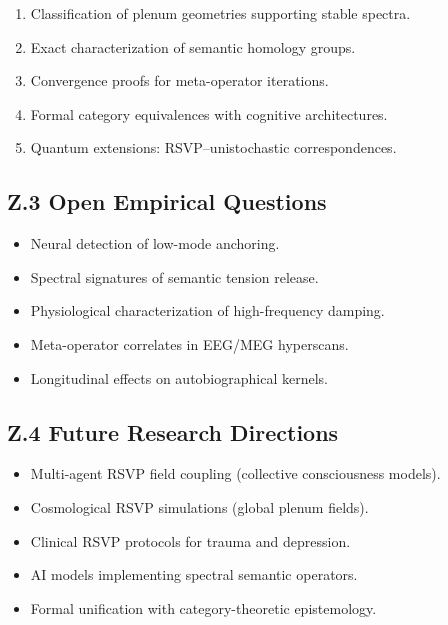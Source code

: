 \documentclass[12pt]{article}
\begin{document}
\begin{enumerate}
    \item Classification of plenum geometries supporting stable spectra.
    \item Exact characterization of semantic homology groups.
    \item Convergence proofs for meta-operator iterations.
    \item Formal category equivalences with cognitive architectures.
    \item Quantum extensions: RSVP–unistochastic correspondences.
\end{enumerate}

\subsection*{Z.3 Open Empirical Questions}

\begin{itemize}
    \item Neural detection of low-mode anchoring.
    \item Spectral signatures of semantic tension release.
    \item Physiological characterization of high-frequency damping.
    \item Meta-operator correlates in EEG/MEG hyperscans.
    \item Longitudinal effects on autobiographical kernels.
\end{itemize}

\subsection*{Z.4 Future Research Directions}

\begin{itemize}
    \item Multi-agent RSVP field coupling (collective consciousness models).
    \item Cosmological RSVP simulations (global plenum fields).
    \item Clinical RSVP protocols for trauma and depression.
    \item AI models implementing spectral semantic operators.
    \item Formal unification with category-theoretic epistemology.
\end{itemize}
\end{document}
